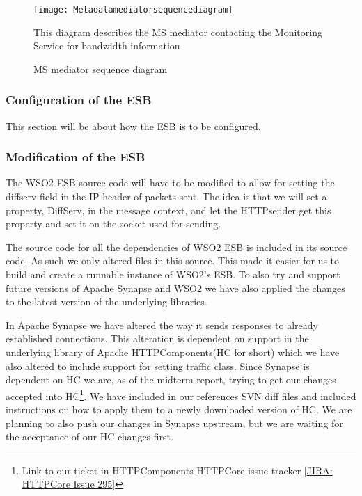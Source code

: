         \begin{figure}[H]
            \centering
            \texttt{[image: Metadatamediatorsequencediagram]}
            \caption{MS mediator sequence diagram}
            This diagram describes the MS mediator contacting the Monitoring Service for bandwidth information
            \label{fig:Metadatamediatorsequencediagram}
        \end{figure}

    \subsubsection{Configuration of the ESB}\label{Configuration of the ESB} 
    This section will be about how the ESB is to be configured.

    \subsubsection{Modification of the ESB}\label{Modification of the ESB} 
		The WSO2 ESB source code will have to be modified to allow for setting the diffserv field in the IP-header of packets sent. The idea is that we will set a property, DiffServ, in the message context, and let the HTTPsender get this property and set it on the socket used for sending.

The source code for all the dependencies of WSO2 ESB is included in its source code. As such we only altered files in this source. This made it easier for us to build and create a runnable instance of WSO2’s ESB. To also try and support future versions of Apache Synapse and WSO2 we have also applied the changes to the latest version of the underlying libraries.

In Apache Synapse we have altered the way it sends responses to already established connections. This alteration is dependent on support in the underlying library of Apache HTTPComponents(HC for short) which we have also altered to include support for setting traffic class. Since Synapse is dependent on HC we are, as of the midterm report, trying to get our changes accepted into HC\footnote{Link to our ticket in HTTPComponents HTTPCore issue tracker  [\href{https://issues.apache.org/jira/browse/HTTPCORE-295}{JIRA: HTTPCore Issue 295}]}. We have included in our references SVN diff files and included instructions on how to apply them to a newly downloaded version of HC. We are planning to also push our changes in Synapse upstream, but we are waiting for the acceptance of our HC changes first.
    
